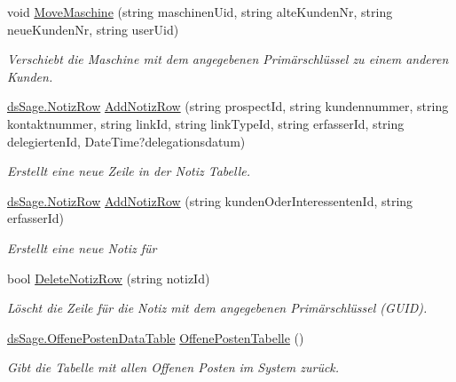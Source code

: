 \begin{DoxyCompactItemize}
void \hyperlink{class_products_1_1_data_1_1_data_service_a3e105074934713adf5854239b1afdc8a}{Move\+Maschine} (string maschinen\+Uid, string alte\+Kunden\+Nr, string neue\+Kunden\+Nr, string user\+Uid)
\begin{DoxyCompactList}\small\item\em Verschiebt die Maschine mit dem angegebenen Primärschlüssel zu einem anderen Kunden. \end{DoxyCompactList}\item 
\hyperlink{class_products_1_1_data_1_1ds_sage_1_1_notiz_row}{ds\+Sage.\+Notiz\+Row} \hyperlink{class_products_1_1_data_1_1_data_service_a328874a93ff1cb7c7f3e723a92e9907a}{Add\+Notiz\+Row} (string prospect\+Id, string kundennummer, string kontaktnummer, string link\+Id, string link\+Type\+Id, string erfasser\+Id, string delegierten\+Id, Date\+Time?delegationsdatum)
\begin{DoxyCompactList}\small\item\em Erstellt eine neue Zeile in der Notiz Tabelle. \end{DoxyCompactList}\item 
\hyperlink{class_products_1_1_data_1_1ds_sage_1_1_notiz_row}{ds\+Sage.\+Notiz\+Row} \hyperlink{class_products_1_1_data_1_1_data_service_a0deb45dc7faf7147be7b661853133667}{Add\+Notiz\+Row} (string kunden\+Oder\+Interessenten\+Id, string erfasser\+Id)
\begin{DoxyCompactList}\small\item\em Erstellt eine neue Notiz für \end{DoxyCompactList}\item 
bool \hyperlink{class_products_1_1_data_1_1_data_service_a0ad9806620cf1c310bcc6312ac5b7d38}{Delete\+Notiz\+Row} (string notiz\+Id)
\begin{DoxyCompactList}\small\item\em Löscht die Zeile für die Notiz mit dem angegebenen Primärschlüssel (G\+U\+ID). \end{DoxyCompactList}\item 
\hyperlink{class_products_1_1_data_1_1ds_sage_1_1_offene_posten_data_table}{ds\+Sage.\+Offene\+Posten\+Data\+Table} \hyperlink{class_products_1_1_data_1_1_data_service_a803edccc6d40ffc3f84cab58df734c27}{Offene\+Posten\+Tabelle} ()
\begin{DoxyCompactList}\small\item\em Gibt die Tabelle mit allen Offenen Posten im System zurück. \end{DoxyCompactList}\item 

\end{DoxyCompactItemize}
